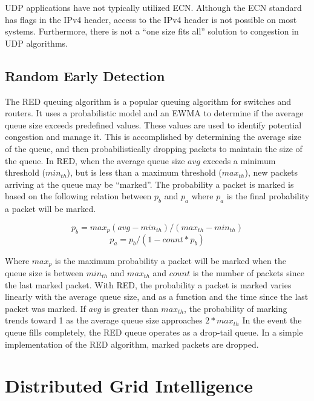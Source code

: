 UDP applications have not typically utilized \ac{ECN}.
Although the \ac{ECN} standard has flags in the IPv4 header, access to the IPv4 header is not possible on most systems.
Furthermore, there is not a ``one size fits all'' solution to congestion in UDP algorithms.

\subsection{Random Early Detection}
The \ac{RED} queuing algorithm is a popular queuing algorithm for switches and routers.
It uses a probabilistic model and an \ac{EWMA} to determine if the average queue size exceeds predefined values.
These values are used to identify potential congestion and manage it.
This is accomplished by determining the average size of the queue, and then probabilistically dropping packets to maintain the size of the queue.
In \ac{RED}, when the average queue size $avg$ exceeds a minimum threshold ($min_{th}$), but is less than a maximum threshold ($max_{th}$), new packets arriving at the queue may be ``marked''.
The probability a packet is marked is based on the following relation between $p_{b}$ and $p_{a}$ where $p_{a}$ is the final probability a packet will be marked.

\begin{equation}
p_{b} = max_p (avg - min_{th}) / (max_{th}-min_{th})
\end{equation}
\begin{equation}
p_{a} = p_{b} / (1-count * p_b)
\end{equation}

Where $max_p$ is the maximum probability a packet will be marked when the queue size is between $min_{th}$ and $max_{th}$ and $count$ is the number of packets since the last marked packet.
With \ac{RED}, the probability a packet is marked varies linearly with the average queue size, and as a function and the time since the last packet was marked.
If $avg$ is greater than $max_{th}$, the probability of marking trends toward 1 as the average queue size approaches $2*max_{th}$
In the event the queue fills completely, the \ac{RED} queue operates as a drop-tail queue.
In a simple implementation of the \ac{RED} algorithm, marked packets are dropped.

\section{Distributed Grid Intelligence}

